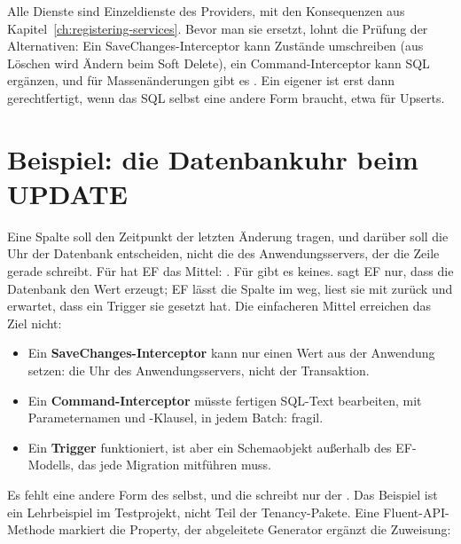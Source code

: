 Alle Dienste sind Einzeldienste des Providers, mit den Konsequenzen aus
Kapitel~\ref{ch:registering-services}. Bevor man sie ersetzt, lohnt die Prüfung der
Alternativen: Ein SaveChanges-Interceptor kann Zustände umschreiben (aus Löschen wird Ändern
beim Soft Delete), ein Command-Interceptor kann SQL ergänzen, und für Massenänderungen gibt
es . Ein eigener
 ist erst dann gerechtfertigt, wenn das
SQL selbst eine andere Form braucht, etwa  für Upserts.

\section{Beispiel: die Datenbankuhr beim UPDATE}

Eine Spalte  soll den Zeitpunkt der letzten Änderung tragen, und
darüber soll die Uhr der Datenbank entscheiden, nicht die des Anwendungsservers, der die Zeile
gerade schreibt. Für  hat EF das Mittel:
. Für
 gibt es keines.
sagt EF nur, dass die Datenbank den Wert erzeugt; EF lässt die Spalte im  weg, liest
sie mit  zurück und erwartet, dass ein Trigger sie gesetzt hat. Die einfacheren
Mittel erreichen das Ziel nicht:

\begin{itemize}
  \item Ein \textbf{SaveChanges-Interceptor} kann nur einen Wert aus der Anwendung setzen: die
    Uhr des Anwendungsservers, nicht  der Transaktion.
  \item Ein \textbf{Command-Interceptor} müsste fertigen SQL-Text bearbeiten, mit
    Parameternamen und -Klausel, in jedem Batch: fragil.
  \item Ein \textbf{Trigger} funktioniert, ist aber ein Schemaobjekt außerhalb des EF-Modells,
    das jede Migration mitführen muss.
\end{itemize}

Es fehlt eine andere Form des  selbst, und die schreibt nur der
. Das Beispiel ist ein Lehrbeispiel im
Testprojekt, nicht Teil der Tenancy-Pakete. Eine Fluent-API-Methode markiert die Property, der
abgeleitete Generator ergänzt die Zuweisung:

